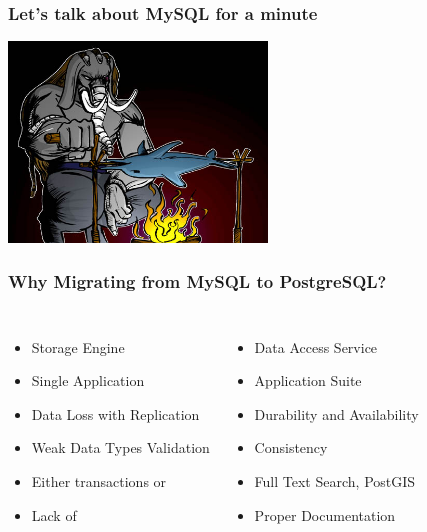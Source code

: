 \documentclass{beamer}
\begin{document}
\begin{frame}
  \frametitle{Let's talk about MySQL for a minute}

  
  \begin{center}
    \includegraphics[height=2.1in]{postgresql_versus_mysql.jpg}
  \end{center}
\end{frame}

\begin{frame}[fragile]
  \frametitle{Why Migrating from MySQL to PostgreSQL?}
  
\begin{columns}[c]

  \vfill

  \begin{itemize}
  \item Storage Engine
  \item Single Application
  \item Data Loss with Replication
  \item Weak Data Types Validation
  \item Either transactions or
  \item Lack of
  \end{itemize}


  \vfill

  \begin{itemize}
  \item Data Access Service
  \item Application Suite
  \item Durability and Availability
  \item Consistency
  \item Full Text Search, PostGIS
  \item Proper Documentation
  \end{itemize}
\end{columns}
\end{frame}
\end{document}
